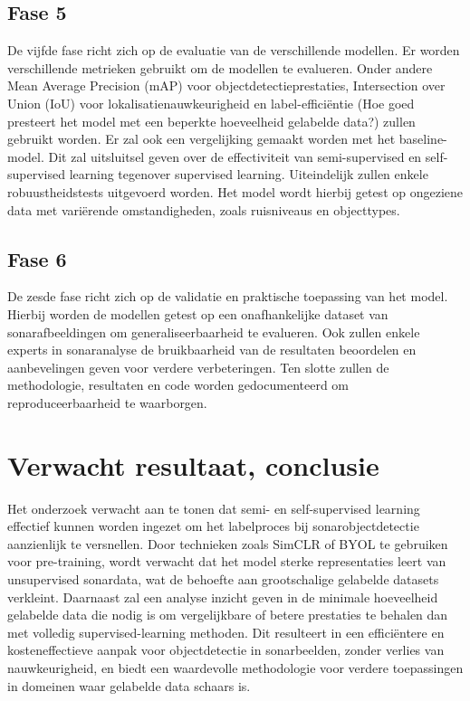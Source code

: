 \subsection{Fase 5}

De vijfde fase richt zich op de evaluatie van de verschillende modellen. Er worden verschillende metrieken gebruikt om de modellen te evalueren. Onder andere Mean Average Precision (mAP) voor objectdetectieprestaties, Intersection over Union (IoU) voor lokalisatienauwkeurigheid en label-efficiëntie (Hoe goed presteert het model met een beperkte hoeveelheid gelabelde data?) zullen gebruikt worden. Er zal ook een vergelijking gemaakt worden met het baseline-model. Dit zal uitsluitsel geven over de effectiviteit van semi-supervised en self-supervised learning tegenover supervised learning. Uiteindelijk zullen enkele robuustheidstests uitgevoerd worden. Het model wordt hierbij getest op ongeziene data met variërende omstandigheden, zoals ruisniveaus en objecttypes.

\subsection{Fase 6}

De zesde fase richt zich op de validatie en praktische toepassing van het model. Hierbij worden de modellen getest op een onafhankelijke dataset van sonarafbeeldingen om generaliseerbaarheid te evalueren. Ook zullen enkele experts in sonaranalyse de bruikbaarheid van de resultaten beoordelen en aanbevelingen geven voor verdere verbeteringen. Ten slotte zullen de methodologie, resultaten en code worden gedocumenteerd om reproduceerbaarheid te waarborgen.

\section{Verwacht resultaat, conclusie}%
\label{sec:verwachte_resultaten}

Het onderzoek verwacht aan te tonen dat semi- en self-supervised learning effectief kunnen worden ingezet om het labelproces bij sonarobjectdetectie aanzienlijk te versnellen. Door technieken zoals SimCLR of BYOL te gebruiken voor pre-training, wordt verwacht dat het model sterke representaties leert van unsupervised sonardata, wat de behoefte aan grootschalige gelabelde datasets verkleint. Daarnaast zal een analyse inzicht geven in de minimale hoeveelheid gelabelde data die nodig is om vergelijkbare of betere prestaties te behalen dan met volledig supervised-learning methoden. Dit resulteert in een efficiëntere en kosteneffectieve aanpak voor objectdetectie in sonarbeelden, zonder verlies van nauwkeurigheid, en biedt een waardevolle methodologie voor verdere toepassingen in domeinen waar gelabelde data schaars is.

